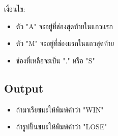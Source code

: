 \documentclass{article}
\begin{document}
เงื่อนไข:



\begin{itemize}

\tightlist

\item

  ตัว "A" จะอยู่ที่ช่องสุดท้ายในแถวแรก

\item

  ตัว "M" จะอยู่ที่ช่องแรกในแถวสุดท้าย

\item

  ช่องที่เหลือจะเป็น "." หรือ "S"

\end{itemize}



\subsection*{Output}
\begin{itemize}

\tightlist

\item

  ถ้ามาเรียชนะให้พิมพ์คำว่า "WIN"

\item

  ถ้ารูปปั้นชนะให้พิมพ์คำว่า "LOSE"

\end{itemize}
\end{document}
